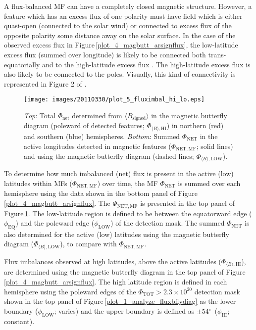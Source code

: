 \documentclass[namedreferences]{solarphysics}
\newcommand{\degr}{\ensuremath{^\circ}}
\begin{document}
\begin{article}
A flux-balanced MF can have a completely closed magnetic structure. However, a feature which has an excess flux of one polarity must have field which is either quasi-open (connected to the solar wind) or connected to excess flux of the opposite polarity some distance away on the solar surface. In the case of the observed excess flux in Figure\,\ref{plot_4_magbutt_arsignflux}, the low-latitude excess flux (summed over longitude) is likely to be connected both trans-equatorially and to the high-latitude excess flux \citep{Choudhary:2002}. The high-latitude excess flux is also likely to be connected to the poles. Visually, this kind of connectivity is represented in Figure 2 of \citet{Bravo:1998}.


\begin{figure}[!ht]
\begin{center}
\texttt{[image: images/20110330/plot\_5\_fluximbal\_hi\_lo.eps]}
\end{center}
\caption{\emph{Top}: Total $\Phi_{\mathrm{net}}$ determined from $\langle B_{\mathrm{signed}}\rangle$ in the magnetic butterfly diagram (poleward of detected features; $\Phi_{\langle B \rangle,\mathrm{HI}}$) in northern (red) and southern (blue) hemispheres. \emph{Bottom}: Summed $\Phi_{\mathrm{NET}}$ in the active longitudes detected in magnetic features ($\Phi_{\mathrm{NET,MF}}$; solid lines) and using the magnetic butterfly diagram (dashed lines; $\Phi_{\langle B \rangle,\mathrm{LOW}}$).}
\label{plot_5_fluximbal_hi_lo}
\end{figure}

To determine how much imbalanced (net) flux is present in the active (low) latitudes within MFs ($\Phi_{\mathrm{NET,MF}}$) over time, the MF $\Phi_{\mathrm{NET}}$ is summed over each hemisphere using the data shown in the bottom panel of Figure\,\ref{plot_4_magbutt_arsignflux}. The $\Phi_{\mathrm{NET,MF}}$ is presented in the top panel of Figure\,\ref{plot_5_fluximbal_hi_lo}. The low-latitude region is defined to be between the equatorward edge ($\phi_\mathrm{EQ}$) and the poleward edge ($\phi_\mathrm{LOW}$) of the detection mask. The summed $\Phi_{\mathrm{NET}}$ is also determined for the active (low) latitudes using the magnetic butterfly diagram ($\Phi_{\langle B \rangle,\mathrm{LOW}}$), to compare with $\Phi_{\mathrm{NET,MF}}$. 

Flux imbalances observed at high latitudes, above the active latitudes ($\Phi_{\langle B \rangle,\mathrm{HI}}$), are determined using the magnetic butterfly diagram in the top panel of Figure\,\ref{plot_4_magbutt_arsignflux}. The high latitude region is defined in each hemisphere using the poleward edges of the $\Phi_{\mathrm{TOT}} > 2.3\times10^{20}$ detection mask shown in the top panel of Figure\,\ref{plot_1_analyze_fluxbflydiag} as the lower boundary ($\phi_\mathrm{LOW}$; varies) and the upper boundary is defined as $\pm$54\degr\ ($\phi_\mathrm{HI}$; constant). 


\end{article}
\end{document}
